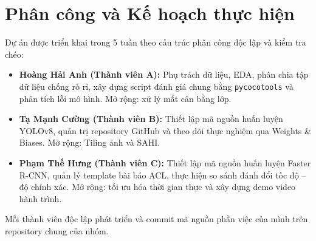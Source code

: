 \documentclass[11pt]{article}
\begin{document}

\section{Phân công và Kế hoạch thực hiện}

Dự án được triển khai trong 5 tuần theo cấu trúc phân công độc lập và kiểm tra chéo:

\begin{itemize}
\itemsep0pt
\item \textbf{Hoàng Hải Anh (Thành viên A):} Phụ trách dữ liệu, EDA, phân chia tập dữ liệu chống rò rỉ, xây dựng script đánh giá chung bằng \texttt{pycocotools} và phân tích lỗi mô hình. Mở rộng: xử lý mất cân bằng lớp.
\item \textbf{Tạ Mạnh Cường (Thành viên B):} Thiết lập mã nguồn huấn luyện YOLOv8, quản trị repository GitHub và theo dõi thực nghiệm qua Weights \& Biases. Mở rộng: Tiling ảnh và SAHI.
\item \textbf{Phạm Thế Hưng (Thành viên C):} Thiết lập mã nguồn huấn luyện Faster R-CNN, quản lý template bài báo ACL, thực hiện so sánh đánh đổi tốc độ -- độ chính xác. Mở rộng: tối ưu hóa thời gian thực và xây dựng demo video hành trình.
\end{itemize}

Mỗi thành viên độc lập phát triển và commit mã nguồn phần việc của mình trên repository chung của nhóm.



\end{document}
